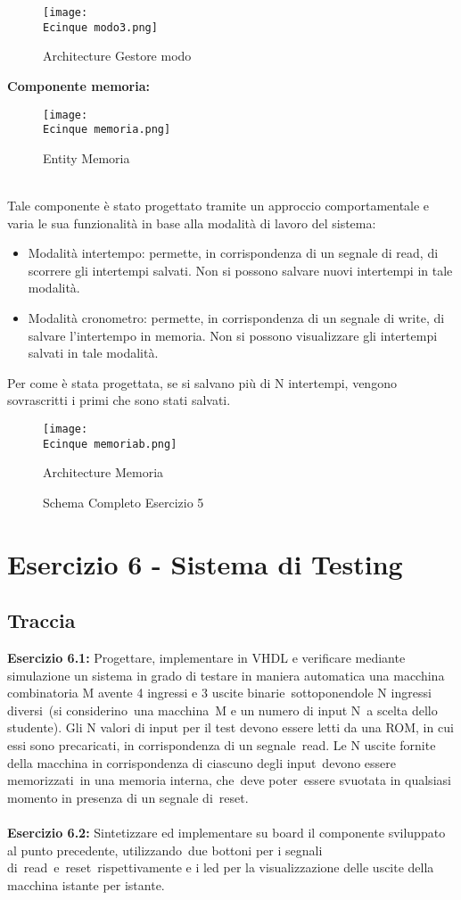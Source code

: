 \documentclass[12pt]{article}
\def \Ecinque {Allegati/Esercizio5/}
\begin{document}
\begin{figure}[ht!]
    \texttt{[image: \\Ecinque modo3.png]}
    \caption{Architecture Gestore modo}
\end{figure}
\clearpage
{\large \textbf{Componente memoria:}}
\begin{figure}[ht!]
    \centering
    \texttt{[image: \\Ecinque memoria.png]}
    \caption{Entity Memoria}
\end{figure}
\\Tale componente è stato progettato tramite un approccio comportamentale e varia le sua funzionalità in base alla modalità di lavoro del sistema:
\begin{itemize}
    \item Modalità intertempo: permette, in corrispondenza di un segnale di read, di scorrere gli intertempi salvati. Non si possono salvare nuovi intertempi in tale modalità.
    \item Modalità cronometro: permette, in corrispondenza di un segnale di write, di salvare l’intertempo in memoria. Non si possono visualizzare gli intertempi salvati in tale modalità.
\end{itemize}
Per come è stata progettata, se si salvano più di N intertempi, vengono sovrascritti i primi che sono stati salvati.
\begin{figure}[ht!]
    \centering
    \texttt{[image: \\Ecinque memoriab.png]}
    \caption{Architecture Memoria}
\end{figure}
\begin{figure}[ht!]
    \centering
    
    \caption{Schema Completo Esercizio 5}
\end{figure}
\clearpage
\section{Esercizio 6 - Sistema di Testing}
\subsection{Traccia}
\textbf{Esercizio 6.1:} Progettare, implementare in VHDL e verificare mediante simulazione un sistema in grado di testare in maniera automatica una macchina combinatoria M avente 4 ingressi e 3 uscite binarie sottoponendole N ingressi diversi (si considerino una macchina M e un numero di input N a scelta dello studente).
Gli N valori di input per il test devono essere letti da una ROM, in cui essi sono precaricati, in corrispondenza di un segnale read. Le N uscite fornite della macchina in corrispondenza di ciascuno degli input devono essere memorizzati in una memoria interna, che deve poter essere svuotata in qualsiasi momento in presenza di un segnale di reset.
\\\\\textbf{Esercizio 6.2:} Sintetizzare ed implementare su board il componente sviluppato al punto precedente, utilizzando due bottoni per i segnali di read e reset rispettivamente e i led per la visualizzazione delle uscite della macchina istante per istante.
\end{document}
